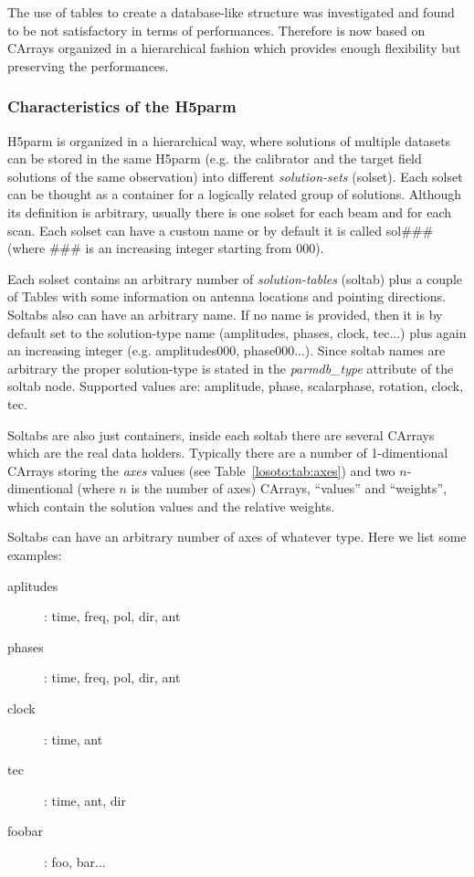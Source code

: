 \documentclass[structabstract]{article}
\begin{document}
The use of tables to create a database-like structure was investigated and found to be not satisfactory in terms of performances. Therefore \losoto{} is now based on CArrays organized in a hierarchical fashion which provides enough flexibility but preserving the performances.

\subsubsection{Characteristics of the H5parm}
\label{losoto:characteristics_h5parm}

H5parm is organized in a hierarchical way, where solutions of multiple datasets can be stored in the same H5parm (e.g. the calibrator and the target field solutions of the same observation) into different \textit{solution-sets} (solset). Each solset can be thought as a container for a logically related group of solutions. Although its definition is arbitrary, usually there is one solset for each beam and for each scan. Each solset can have a custom name or by default it is called sol\#\#\# (where \#\#\# is an increasing integer starting from 000).

Each solset contains an arbitrary number of \textit{solution-tables} (soltab) plus a couple of Tables with some information on antenna locations and pointing directions. Soltabs also can have an arbitrary name. If no name is provided, then it is by default set to the solution-type name (amplitudes, phases, clock, tec...) plus again an increasing integer (e.g. amplitudes000, phase000...). Since soltab names are arbitrary the proper solution-type is stated in the \textit{parmdb\_type} attribute of the soltab node. Supported values are: amplitude, phase, scalarphase, rotation, clock, tec.

Soltabs are also just containers, inside each soltab there are several CArrays which are the real data holders. Typically there are a number of 1-dimentional CArrays storing the \textit{axes} values (see Table~\ref{losoto:tab:axes}) and two $n$-dimentional (where $n$ is the number of axes) CArrays, ``values'' and ``weights'', which contain the solution values and the relative weights.

Soltabs can have an arbitrary number of axes of whatever type. Here we list some examples:
\begin{description}
 \item[aplitudes]: time, freq, pol, dir, ant
 \item[phases]: time, freq, pol, dir, ant
 \item[clock]: time, ant
 \item[tec]: time, ant, dir
 \item[foobar]: foo, bar...
\end{description}
\end{document}
